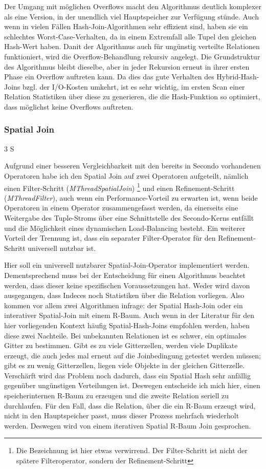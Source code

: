 \documentclass[a4paper,12pt,twoside]{article}
\newcommand{\Fb}[1]{\textit{#1}} %
\begin{document}
Der Umgang mit möglichen Overflows macht den Algorithmus deutlich komplexer als eine Version, in der unendlich viel Hauptspeicher zur Verfügung stünde. Auch wenn in vielen Fällen Hash-Join-Algorithmen sehr effizient sind, haben sie ein schlechtes Worst-Case-Verhalten, da in einem Extremfall alle Tupel den gleichen Hash-Wert haben. Danit der Algorithmus auch für ungünstig verteilte Relationen funktioniert, wird die Overflow-Behandlung rekursiv angelegt. Die Grundstruktur des Algorithmus bleibt dieselbe, aber in jeder Rekursion erneut in ihrer ersten Phase ein Overflow auftreten kann. Da dies das gute Verhalten des Hybrid-Hash-Joins bzgl. der I/O-Kosten umkehrt, ist es sehr wichtig, im ersten Scan einer Relation Statistiken über diese zu generieren, die die Hash-Funktion so optimiert, dass möglichst keine Overflows auftreten.

\subsubsection{Spatial Join} 3 S

Aufgrund einer besseren Vergleichbarkeit mit den bereits in Secondo vorhandenen Operatoren habe ich den Spatial Join auf zwei Operatoren aufgeteilt, nämlich einen Filter-Schritt (\Fb{MThreadSpatialJoin}) \footnote{Die Bezeichnung ist hier etwas verwirrend. Der Filter-Schritt ist nicht der spätere Filteroperator, sondern der Refinement-Schritt} und einen Refinement-Schritt (\Fb{MThreadFilter}), auch wenn ein Performance-Vorteil zu erwarten ist, wenn beide Operatoren in einem Operator zusammengefasst werden, da einerseits eine Weitergabe des Tuple-Stroms über eine Schnittstelle des Secondo-Kerns entfällt und die Möglichkeit eines dynamischen Load-Balancing besteht. Ein weiterer Vorteil der Trennung ist, dass ein separater Filter-Operator für den Refinement-Schritt universell nutzbar ist.

Hier soll ein universell nutzbarer Spatial-Join-Operator implementiert werden. Dementsprechend muss bei der Entscheidung für einen Algorithmus beachtet werden, dass dieser keine spezifischen Voraussetzungen hat. Weder wird davon ausgegangen, dass Indeces noch Statistiken über die Relation vorliegen. Also kommen vor allem zwei Algorithmen infrage: der Spatial Hash-Join oder ein interativer Spatial-Join mit einem R-Baum. Auch wenn in der Literatur für den hier vorliegenden Kontext häufig Spatial-Hash-Joins empfohlen werden, haben diese zwei Nachteile. Bei unbekannten Relationen ist es schwer, ein optimales Gitter zu bestimmen. Gibt es zu viele Gitterzellen, werden viele Duplikate erzeugt, die auch jedes mal erneut auf die Joinbedingung getestet werden müssen;  gibt es zu wenig Gitterzellen, liegen viele Objekte in der gleichen Gitterzelle. Verschärft wird das Problem noch dadurch, dass ein Spatial Hash sehr anfällig gegenüber ungünstigen Verteilungen ist. Deswegen entscheide ich mich hier, einen speicherinternen R-Baum zu erzeugen und die zweite Relation seriell zu durchlaufen. Für den Fall, dass die Relation, über die ein R-Baum erzeugt wird, nicht in den Hauptspeicher passt, muss dieser Prozess mehrfach wiederholt werden. Deswegen wird von einem iterativen Spatial R-Baum Join gesprochen.
\end{document}
